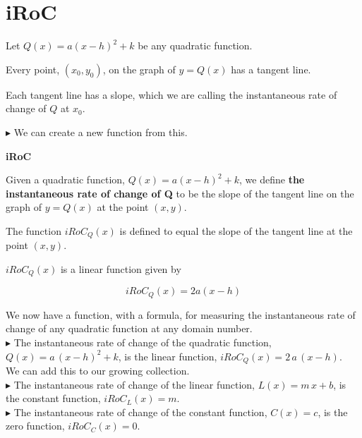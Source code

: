 \documentclass{ximera}
\begin{document}
\section*{iRoC}

Let $Q(x) = a (x - h)^2 + k$ be any quadratic function.

Every point, $(x_0, y_0)$, on the graph of $y = Q(x)$ has a tangent line.

Each tangent line has a slope, which we are calling the instantaneous rate of change of $Q$ at $x_0$.


\textbf{\textcolor{red!90!darkgray}{$\blacktriangleright$}} We can create a new function from this.



\begin{definition} \textbf{\textcolor{green!50!black}{iRoC}}  


Given a quadratic function, $Q(x) = a (x - h)^2 + k$, we define \textbf{the instantaneous rate of change of Q} to be the slope of the tangent line on the graph of $y = Q(x)$ at the point $(x, y)$.


The function $iRoC_Q(x)$ is defined to equal the slope of the tangent line at the point $(x, y)$.


$iRoC_Q(x)$ is a linear function given by 

\[  iRoC_Q(x) = 2 a (x-h) \]

\end{definition}


We now have a function, with a formula, for measuring the instantaneous rate of change of any quadratic function at any domain number. \\


\textbf{\textcolor{red!90!darkgray}{$\blacktriangleright$}} The instantaneous rate of change of the quadratic function, $Q(x) = a \, (x - h)^2 + k$, is the linear function, $iRoC_Q(x) = 2 \, a \, (x-h)$. \\




We can add this to our growing collection. \\ 


\textbf{\textcolor{red!90!darkgray}{$\blacktriangleright$}} The instantaneous rate of change of the linear function, $L(x) = m \, x + b$, is the constant function, $iRoC_L(x) = m$. \\



\textbf{\textcolor{red!90!darkgray}{$\blacktriangleright$}} The instantaneous rate of change of the constant function, $C(x) = c$, is the zero function, $iRoC_C(x) = 0$. \\
\end{document}
